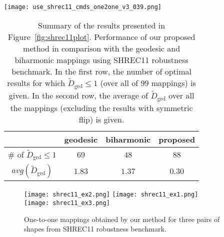 \begin{figure*}[htb]
  \centering
  \texttt{[image: use\_shrec11\_cmds\_one2one\_v3\_039.png]}
  \caption{\label{fig:shrec11plot}
  Normalized average ground truth error ${\widetilde{D}_{\mathrm{grd}}}$ for one-to-one mappings between topologically different pairs of shapes from SHREC11 robustness benchmark. The errors in green and blue color are obtained using geodesic-based and biharmonic-based mapping, respectively. The errors in red color shows the performance of our approach. Some correspondence errors are high due to the symmetric flip (SF) problem indicated by triangles. Observe that our approach successfully handles topology noise by using topologically comparable forms of the input shapes.
  }
\end{figure*}
\begin{table}[t]
\centering
\begin{tabular}{|c|c|c|c|}
\hline
 & geodesic & biharmonic & proposed \\
 \hline
 {$\#$ of ${\widetilde{D}_{\mathrm{grd}}} \le 1$} & $69$ & $48$ & $88$ \\
 \hline
 $avg({\widetilde{D}_{\mathrm{grd}}})$ & $1.83$ & $1.37$ & $0.30$\\
 \hline
\end{tabular}
\caption{\label{table:shrec11res}
Summary of the results presented in Figure~\ref{fig:shrec11plot}. Performance of our proposed method in comparison with the geodesic and biharmonic mappings using SHREC11 robustness benchmark. In the first row, the number of optimal results for which ${\widetilde{D}_{\mathrm{grd}}}\le 1$ (over all of $99$ mappings) is given. In the second row, the average of ${\widetilde{D}_{\mathrm{grd}}}$ over all the mappings (excluding the results with symmetric flip) is given.}
\end{table}
\begin{figure}[h!]
  \centering
  \texttt{[image: shrec11\_ex2.png]}
  \texttt{[image: shrec11\_ex1.png]}\\
  \texttt{[image: shrec11\_ex3.png]}
  \caption{\label{fig:shrec11ex}
  One-to-one mappings obtained by our method for three pairs of shapes from SHREC11 robustness benchmark.
  }
\end{figure}
